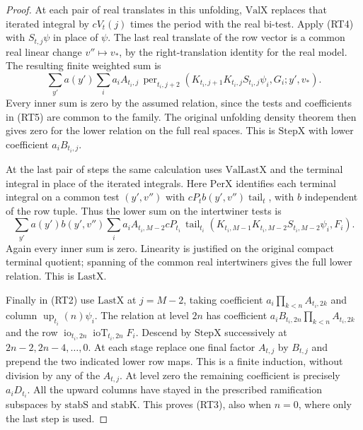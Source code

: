 \begin{proof}
At each pair of real translates in this unfolding,
\(\mathrm{ValX}\) replaces that iterated integral by \(cV_t(j)\)
times the period with the real bi-test. Apply (RT4) with
\(S_{t,j}\psi\) in place of \(\psi\). The last real translate
of the row vector is a common real linear change \(v''\mapsto
v_*\), by the right-translation identity for the real model.
The resulting finite weighted sum is
\[
 \sum_{y'}a(y')\sum_i a_i A_{t_i,j}\,
   \operatorname{per}_{t_i,j+2}
   (K_{t_i,j+1}K_{t_i,j}S_{t_i,j}\psi_i,G_i;y',v_*).
 \tag{RT5}
\]
Every inner sum is zero by the assumed relation, since the
tests and coefficients in (RT5) are common to the family.
The original unfolding density theorem then gives zero for
the lower relation on the full real spaces. This is
\(\mathrm{StepX}\) with lower coefficient \(a_iB_{t_i,j}\).

At the last pair of steps the same calculation uses
\(\mathrm{ValLastX}\) and the terminal integral in place of the
iterated integrals. Here \(\mathrm{PerX}\) identifies each
terminal integral on a common test \((y',v'')\) with
\(cP_t b(y',v'')\operatorname{tail}_t\), with \(b\) independent
of the row tuple. Thus the lower sum on the intertwiner tests
is
\[
 \sum_{y'}a(y')b(y',v'')\sum_i
   a_i A_{t_i,M-2}cP_{t_i}\,
     \operatorname{tail}_{t_i}
     (K_{t_i,M-1}K_{t_i,M-2}S_{t_i,M-2}\psi_i,F_i).
 \tag{RT6}
\]
Again every inner sum is zero. Linearity is justified on the
original compact terminal quotient; spanning of the common
real intertwiners gives the full lower relation.
This is \(\mathrm{LastX}\).

Finally in (RT2) use \(\mathrm{LastX}\) at \(j=M-2\),
taking coefficient \(a_i\prod_{k<n}A_{t_i,2k}\) and column
\(\operatorname{up}_{t_i}(n)\psi_i\).
The relation at level \(2n\) has coefficient
\(a_i B_{t_i,2n}\prod_{k<n}A_{t_i,2k}\) and the row
\(\operatorname{io}_{t_i,2n}\operatorname{ioT}_{t_i,2n}F_i\).
Descend by \(\mathrm{StepX}\) successively at
\(2n-2,2n-4,\ldots,0\).
At each stage replace one final factor \(A_{t,j}\) by
\(B_{t,j}\) and prepend the two indicated lower row maps.
This is a finite induction, without division by any of the
\(A_{t,j}\).
At level zero the remaining coefficient is precisely
\(a_iD_{t_i}\). All the upward columns have stayed in the
prescribed ramification subspaces by \(\mathrm{stabS}\) and
\(\mathrm{stabK}\). This proves (RT3), also when \(n=0\),
where only the last step is used.
\end{proof}

